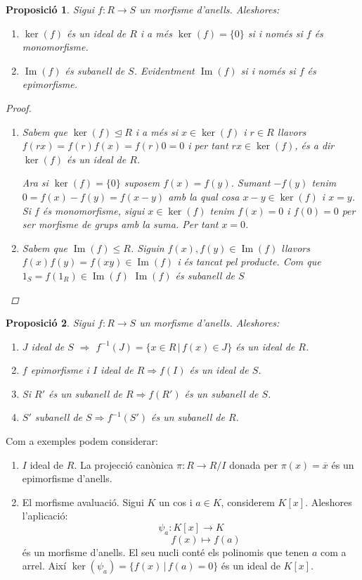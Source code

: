\documentclass[a4paper,11pt]{report}
\newcommand{\inv}[1]{#1^{-1}}
\newcommand{\barra}{\,|\,}
\renewcommand{\bar}{\overline}
\newcommand{\im}{\Rightarrow}
\theoremstyle{theorem}
\newtheorem{proposicio}{\normalfont \sffamily\bfseries Proposició}[section]
\theoremstyle{definition}
\DeclareMathOperator{\ima}{Im}
\begin{document}
\begin{proposicio}
		Sigui $f:R\longrightarrow S$ un morfisme d'anells. Aleshores:
		\begin{enumerate}
			\item $\ker(f)$ és un ideal de $R$ i a més $\ker(f)=\{0\}$ si i només si $f$ és monomorfisme.
			\item $\ima(f) $ és subanell de $S$. Evidentment $\ima(f)$ si i només si $f$ és epimorfisme.
		\end{enumerate}
	\begin{proof}
		\begin{enumerate}
			\item Sabem que $\ker(f)\unlhd R$ i a més si $x\in \ker(f)$ i $r\in R$ llavors $f(rx)=f(r)f(x)=f(r)0=0$ i per tant $rx\in \ker(f)$, és a dir $\ker(f)$ és un ideal de $R$.
			
			Ara si $\ker(f)=\{0\}$ suposem $f(x)=f(y)$. Sumant $-f(y)$ tenim $0=f(x)-f(y)=f(x-y)$ amb la qual cosa $x-y\in \ker(f)$ i $x=y$. Si $f$ és monomorfisme, sigui $x\in \ker(f)$ tenim $f(x)=0$ i $f(0)=0$ per ser morfisme de grups amb la suma. Per tant $x=0$.
			
		\item Sabem que $\ima(f)\leq R$. Siguin $f(x),f(y)\in \ima(f)$ llavors $f(x)f(y)=f(xy)\in \ima(f)$ i és tancat pel producte. Com que $1_S=f(1_R)\in\ima(f)$ $\ima(f)$ és subanell de $S$
		\end{enumerate}
	\end{proof}
\end{proposicio}
\begin{proposicio}
		Sigui $f:R\longrightarrow S$ un morfisme d'anells. Aleshores:\begin{enumerate}
		\item $J$ ideal de $S$ $\im$ $\inv{f}(J)=\{x\in R\barra f(x)\in J\}$ és un ideal de $R$.
		\item $f$ epimorfisme i $I$ ideal de $R\Rightarrow f(I)$ és un ideal de $S$.
		\item Si $R'$ és un subanell de $R\Rightarrow f(R') $ és un subanell de $S$.
		\item $S'$ subanell de $S$$\Rightarrow \inv{f}(S')$ és un subanell de $R$.
		\end{enumerate}
\end{proposicio}
Com a exemples podem considerar:
\begin{enumerate}
	\item $I$ ideal de $R$. La projecció canònica $\pi:R\longrightarrow R/I$ donada per $\pi(x)=\bar{x}$ és un epimorfisme d'anells.
	\item El morfisme avaluació. Sigui $K$ un cos i $a\in K$, considerem $K[x]$.
	Aleshores l'aplicació:
	$$\psi_a:K[x]\longrightarrow K$$ $$\quad\qquad f(x)\longmapsto f(a)$$ és un morfisme d'anells. El seu nucli conté els polinomis que tenen $a$ com a arrel. Així $\ker(\psi_a)=\{f(x)\barra f(a)=0\}$ és un ideal de $K[x]$.
\end{enumerate}
\end{document}
